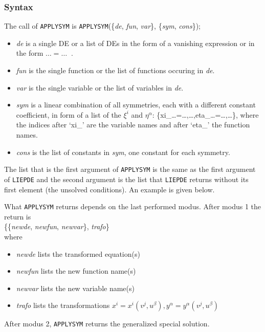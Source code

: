 \subsubsection{Syntax}
The call of \texttt{APPLYSYM} is
{\tt APPLYSYM}(\{{\it de}, {\it fun}, {\it var}\}, \{{\it sym}, {\it cons}\});
\begin{itemize}
\item {\it de} is a single DE or a list of DEs in the form of a vanishing
      expression or in the form $\ldots=\ldots\;\;$.
\item {\it fun} is the single function or the list of functions occuring
      in {\it de}.
\item {\it var} is the single variable or the list of variables in {\it de}.
\item {\it sym} is a linear combination of all symmetries, each with a
      different constant coefficient, in form of a list of the $\xi^i$ and
      $\eta^\alpha$: \{xi\_\ldots=\ldots,\ldots,eta\_\ldots=\ldots,\ldots\},
      where the indices after `xi\_' are the variable names and after `eta\_'
      the function names.
\item {\it cons} is the list of constants in {\it sym}, one constant for each
      symmetry.
\end{itemize}
The list that is the first argument of {\tt APPLYSYM} is the same as the
first argument of {\tt LIEPDE} and the
second argument is the list that {\tt LIEPDE} returns without its first
element (the unsolved conditions). An example is given below.

What {\tt APPLYSYM} returns depends on the last performed modus.
After modus 1 the return is \\
\{\{{\it newde}, {\it newfun}, {\it newvar}\}, {\it trafo}\} \\
where
\begin{itemize}
\item {\it newde} lists the transformed equation(s)
\item {\it newfun} lists the new function name(s)
\item {\it newvar} lists the new variable name(s)
\item {\it trafo} lists the transformations $x^i=x^i(v^j,u^\beta),
      y^\alpha=y^\alpha(v^j,u^\beta)$
\end{itemize}
After modus 2, {\tt APPLYSYM} returns the generalized special solution.
